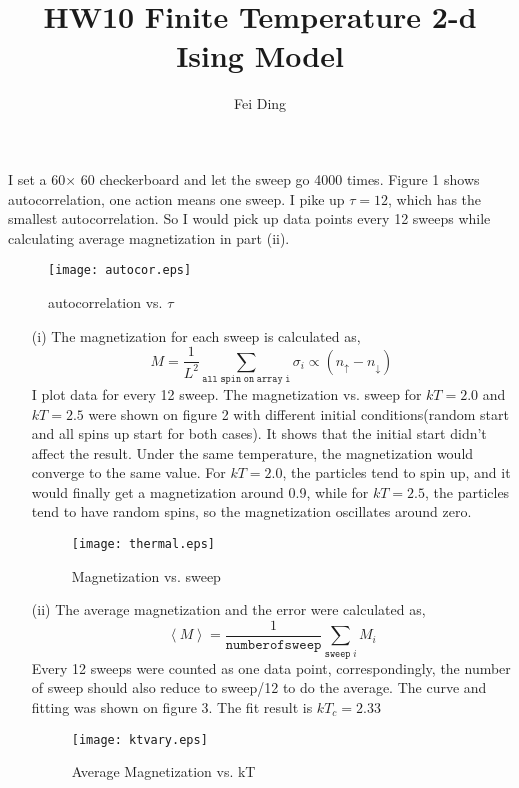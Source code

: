 \documentclass{article}
\title{HW10 Finite Temperature 2-d Ising Model}
\author{Fei Ding}
\begin{document}
\maketitle
\vskip 1cm
I set a 60$\times$ 60 checkerboard and let the sweep go 4000 times.  Figure 1 shows autocorrelation, one action means one sweep.  I pike up $\tau=12$, which has the smallest autocorrelation.  So I would pick up data points every 12 sweeps while calculating average magnetization in part (ii).

  \begin{figure}[ht]
   \begin{center}
   \texttt{[image: autocor.eps]}
   \caption{autocorrelation vs. $\tau$}
   \end{center}
  \end{figure}

\begin{enumerate}
\item[(i)]
The magnetization for each sweep is calculated as,
\[M=\frac{1}{L^2}\sum_{\mathtt{all \; spin\; on\; array\; i}} \sigma_i \propto (n_{\uparrow}-n_{\downarrow})\]
I plot data for every 12 sweep.
The magnetization vs. sweep for $kT=2.0$ and $kT=2.5$ were shown on figure 2 with different initial conditions(random start and all spins up start for both cases).  It shows that the initial start didn't affect the result.  Under the same temperature, the magnetization would converge to the same value.  For $kT=2.0$, the particles tend to spin up, and it would finally get a magnetization around 0.9, while for $kT=2.5$, the particles tend to have random spins, so the magnetization oscillates around zero.
 \begin{figure}[ht]
   \begin{center}
   {\texttt{[image: thermal.eps]}}
   \caption{Magnetization vs. sweep}
   \end{center}
  \end{figure}
 
\item[(ii)]
 The average magnetization and the error were calculated as,
\[\left< M \right> =\frac{1}{\mathtt{number of sweep}} \sum_{\mathtt{sweep}\; i} M_i\]
Every 12 sweeps were counted as one data point, correspondingly, the number of sweep should also reduce to sweep/12 to do the average.  The curve and fitting was shown on figure 3.  The fit result is $kT_c=2.33$
 \begin{figure}[ht]
   \begin{center}
   {\texttt{[image: ktvary.eps]}}
   \caption{Average Magnetization vs. kT}
   \end{center}
  \end{figure}


\end{enumerate}
\end{document}
